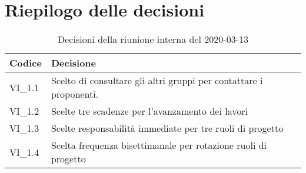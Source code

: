 \section{Riepilogo delle decisioni}
\begin{longtable}{ 
	 >{\centering}p{} >{}p{} }
	
	\caption{Decisioni della riunione interna del 2020-03-13}\\	
	
	\textbf{\color{white}Codice} & 
	\textbf{\color{white}Decisione} 
	\tabularnewline  
	\endhead
	
	VI\_1.1 & Scelto di consultare gli altri gruppi per contattare i proponenti. \\
	VI\_1.2 & Scelte tre scadenze per l'avanzamento dei lavori \\
	VI\_1.3 & Scelte responsabilità immediate per tre ruoli di progetto \\
	VI\_1.4 & Scelta frequenza bisettimanale per rotazione ruoli di progetto \\
	
\end{longtable}